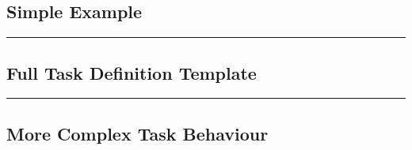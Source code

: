 \documentclass[11pt,a4paper]{article}
\begin{document}
\subsection{Simple Example}

\lstset{language=sh, numbers=left}

{\tiny
\noindent
\rule{5cm}{.2mm}

}

\subsection{Full Task Definition Template}

\lstset{language=sh, numbers=left}

{\tiny
\noindent
\rule{5cm}{.2mm}

}

\subsection{More Complex Task Behaviour}
\end{document}
